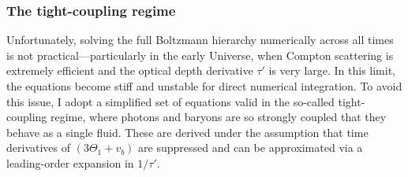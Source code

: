 \documentclass{aa}
\numberwithin{equation}{section}
\numberwithin{table}{section}
\numberwithin{figure}{section}
\begin{document}
\subsubsection{The tight-coupling regime}\label{subsubsec: III theory tight-coupling}
Unfortunately, solving the full Boltzmann hierarchy numerically across all times is not practical—particularly in the early Universe, when Compton scattering is extremely efficient and the optical depth derivative $\tau'$ is very large. In this limit, the equations become stiff and unstable for direct numerical integration. To avoid this issue, I adopt a simplified set of equations valid in the so-called tight-coupling regime, where photons and baryons are so strongly coupled that they behave as a single fluid. These are derived under the assumption that time derivatives of $(3\Theta_1 + v_b)$ are suppressed and can be approximated via a leading-order expansion in $1/\tau'$.
\end{document}
